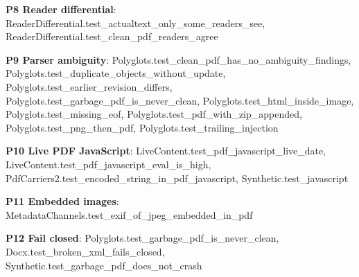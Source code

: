 \documentclass[10pt,a4paper]{article}
\begin{document}
\textbf{P8 Reader differential}: \textcolor{ok}{ReaderDifferential.\allowbreak{}test\_\allowbreak{}actualtext\_\allowbreak{}only\_\allowbreak{}some\_\allowbreak{}readers\_\allowbreak{}see}, \textcolor{ok}{ReaderDifferential.\allowbreak{}test\_\allowbreak{}clean\_\allowbreak{}pdf\_\allowbreak{}readers\_\allowbreak{}agree}\par
\textbf{P9 Parser ambiguity}: \textcolor{ok}{Polyglots.\allowbreak{}test\_\allowbreak{}clean\_\allowbreak{}pdf\_\allowbreak{}has\_\allowbreak{}no\_\allowbreak{}ambiguity\_\allowbreak{}findings}, \textcolor{ok}{Polyglots.\allowbreak{}test\_\allowbreak{}duplicate\_\allowbreak{}objects\_\allowbreak{}without\_\allowbreak{}update}, \textcolor{ok}{Polyglots.\allowbreak{}test\_\allowbreak{}earlier\_\allowbreak{}revision\_\allowbreak{}differs}, \textcolor{ok}{Polyglots.\allowbreak{}test\_\allowbreak{}garbage\_\allowbreak{}pdf\_\allowbreak{}is\_\allowbreak{}never\_\allowbreak{}clean}, \textcolor{ok}{Polyglots.\allowbreak{}test\_\allowbreak{}html\_\allowbreak{}inside\_\allowbreak{}image}, \textcolor{ok}{Polyglots.\allowbreak{}test\_\allowbreak{}missing\_\allowbreak{}eof}, \textcolor{ok}{Polyglots.\allowbreak{}test\_\allowbreak{}pdf\_\allowbreak{}with\_\allowbreak{}zip\_\allowbreak{}appended}, \textcolor{ok}{Polyglots.\allowbreak{}test\_\allowbreak{}png\_\allowbreak{}then\_\allowbreak{}pdf}, \textcolor{ok}{Polyglots.\allowbreak{}test\_\allowbreak{}trailing\_\allowbreak{}injection}\par
\textbf{P10 Live PDF JavaScript}: \textcolor{ok}{LiveContent.\allowbreak{}test\_\allowbreak{}pdf\_\allowbreak{}javascript\_\allowbreak{}live\_\allowbreak{}date}, \textcolor{ok}{LiveContent.\allowbreak{}test\_\allowbreak{}pdf\_\allowbreak{}javascript\_\allowbreak{}eval\_\allowbreak{}is\_\allowbreak{}high}, \textcolor{ok}{PdfCarriers2.\allowbreak{}test\_\allowbreak{}encoded\_\allowbreak{}string\_\allowbreak{}in\_\allowbreak{}pdf\_\allowbreak{}javascript}, \textcolor{ok}{Synthetic.\allowbreak{}test\_\allowbreak{}javascript}\par
\textbf{P11 Embedded images}: \textcolor{ok}{MetadataChannels.\allowbreak{}test\_\allowbreak{}exif\_\allowbreak{}of\_\allowbreak{}jpeg\_\allowbreak{}embedded\_\allowbreak{}in\_\allowbreak{}pdf}\par
\textbf{P12 Fail closed}: \textcolor{ok}{Polyglots.\allowbreak{}test\_\allowbreak{}garbage\_\allowbreak{}pdf\_\allowbreak{}is\_\allowbreak{}never\_\allowbreak{}clean}, \textcolor{ok}{Docx.\allowbreak{}test\_\allowbreak{}broken\_\allowbreak{}xml\_\allowbreak{}fails\_\allowbreak{}closed}, \textcolor{ok}{Synthetic.\allowbreak{}test\_\allowbreak{}garbage\_\allowbreak{}pdf\_\allowbreak{}does\_\allowbreak{}not\_\allowbreak{}crash}\par
\end{document}

